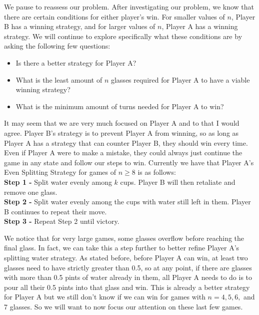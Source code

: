 \documentclass[11pt]{article}
\newcommand{\keywordfont}{\textsc}
\newcommand{\keyword}[1]{%
  \marginpar{\raggedright\small\keywordfont{#1}}}
\begin{document}

We pause to reassess our problem. \keyword{Mini Re-entry} After investigating our problem, we know that there are certain conditions for either player's win. For smaller values of $n$, Player B has a winning strategy, and for larger values of $n$, Player A has a winning strategy. We will continue to explore specifically what these conditions are by asking the \keyword{I want} following few questions:

\begin{itemize}
    \item Is there a better strategy for Player A?
    \item What is the least amount of $n$ glasses required for Player A to have a viable winning strategy?
    \item What is the minimum amount of turns needed for Player A to win?
\end{itemize}

It may seem that we are very much focused on Player A and to that I would agree. Player B's strategy is to prevent Player A from winning, so as long as Player A has a strategy that can counter Player B, they should win every time. Even if Player A were to make a mistake, they could always just continue the game in any state and follow our steps to win. Currently we have that Player A's Even Splitting Strategy for games of $n \geq 8$ is as follows: \\
\textbf{Step 1 -} Split water evenly among $k$ cups. Player B will then retaliate and remove one glass. \\
\textbf{Step 2 -} Split water evenly among the cups with water still left in them. Player B continues to repeat their move. \\
\textbf{Step 3 -} Repeat Step 2 until victory.

We notice that for very large games, \keyword{AHA} some glasses overflow before reaching the final glass. In fact, we can take this a step further to better refine Player A's splitting water strategy. As stated before, before Player A can win, at least two glasses need to have strictly greater than 0.5, so at any point, if there are glasses with more than 0.5 pints of water already in them, all Player A needs to do is to pour all their 0.5 pints into that glass and win. This is already a better strategy for Player A but we still don't know if we can win for games with $n=4,5,6,$ and 7 glasses. So we will want \keyword{I want} to now focus our attention on these last few games.
\end{document}
